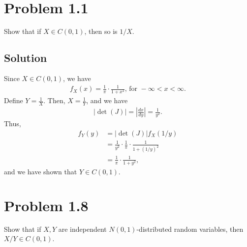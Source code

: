 \documentclass[10pt,a4paper]{article}
\author{Jeremiah Givens}
\theoremstyle{theorem}
\theoremstyle{definition}
\begin{document}
\section*{Problem 1.1}
Show that if $X \in C(0,1)$, then so is $1/X$.

\subsection*{Solution}
Since $X \in C(0, 1)$, we have 
\begin{align*}
f_X(x)  = \frac{1}{\pi} \cdot \frac{1}{1 + x^2} \text{,  for } - \infty < x < \infty.
\end{align*}
Define $Y = \frac{1}{X}$. Then, $X = \frac{1}{Y}$, and we have
\begin{align*}
|\det(J)| = \left|\frac{dx}{dy} \right| = \frac{1}{y^2}.
\end{align*}
Thus,
\begin{align*}
f_Y(y) &= |\det(J)|  f_X(1/y)\\
&= \frac{1}{y^2} \cdot \frac{1}{\pi} \cdot \frac{1}{1 + (1/y)^2}\\
&= \frac{1}{\pi} \cdot \frac{1}{1 + y^2},
\end{align*}
and we have shown that $Y \in C(0, 1)$.

\section*{Problem 1.8}
Show that if $X, Y$ are independent $N(0, 1)$-distributed random variables,  then $X/Y \in C(0, 1)$.
\end{document}
